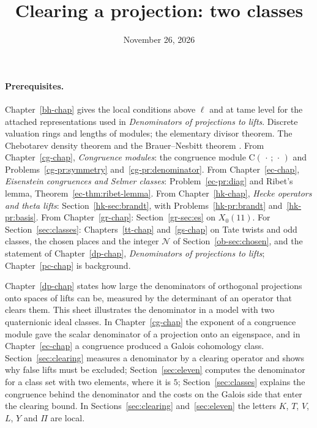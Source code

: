\documentclass[reqno]{amsart}
\title{Clearing a projection: two classes}
\author{}
\date{November 26, 2026}
\newcounter{chap}
\theoremstyle{definition}
\newcommand{\Cg}{\mathrm{C}}
\begin{document}
\maketitle
{}\label{chap}

\paragraph{Prerequisites.}
Chapter~\ref{bh-chap} gives the local conditions above \(\ell\) and at tame level for the attached representations used in \emph{Denominators of projections to lifts}.
Discrete valuation rings and lengths of modules; the elementary divisor theorem.  The Chebotarev density theorem and the Brauer--Nesbitt theorem \cite[(30.16)]{CR}.  From Chapter~\ref{cg-chap}, \emph{Congruence modules}: the congruence module \(\Cg(\,\cdot\,;\,\cdot\,)\) and Problems~\ref{cg-pr:symmetry} and~\ref{cg-pr:denominator}.  From Chapter~\ref{ec-chap}, \emph{Eisenstein congruences and Selmer classes}: Problem~\ref{ec-pr:diag} and Ribet's lemma, Theorem~\ref{ec-thm:ribet-lemma}.  From Chapter~\ref{hk-chap}, \emph{Hecke operators and theta lifts}: Section~\ref{hk-sec:brandt}, with Problems~\ref{hk-pr:brandt} and~\ref{hk-pr:basis}.  From Chapter~\ref{gr-chap}: Section~\ref{gr-sec:es} on \(X_0(11)\).  For Section~\ref{sec:classes}: Chapters~\ref{tt-chap} and~\ref{gs-chap} on Tate twists and odd classes, the chosen places and the integer \(\mathcal N\) of Section~\ref{ob-sec:chosen}, and the statement of Chapter~\ref{dp-chap}, \emph{Denominators of projections to lifts}; Chapter~\ref{pc-chap} is background.

Chapter~\ref{dp-chap} states how large the denominators of orthogonal projections onto spaces of lifts can be, measured by the determinant of an operator that clears them.  This sheet illustrates the denominator in a model with two quaternionic ideal classes.  In Chapter~\ref{cg-chap} the exponent of a congruence module gave the scalar denominator of a projection onto an eigenspace, and in Chapter~\ref{ec-chap} a congruence produced a Galois cohomology class.  Section~\ref{sec:clearing} measures a denominator by a clearing operator and shows why false lifts must be excluded; Section~\ref{sec:eleven} computes the denominator for a class set with two elements, where it is \(5\); Section~\ref{sec:classes} explains the congruence behind the denominator and the costs on the Galois side that enter the clearing bound.  In Sections~\ref{sec:clearing} and~\ref{sec:eleven} the letters \(K\), \(T\), \(V\), \(L\), \(Y\) and \(\Pi\) are local.
\end{document}
